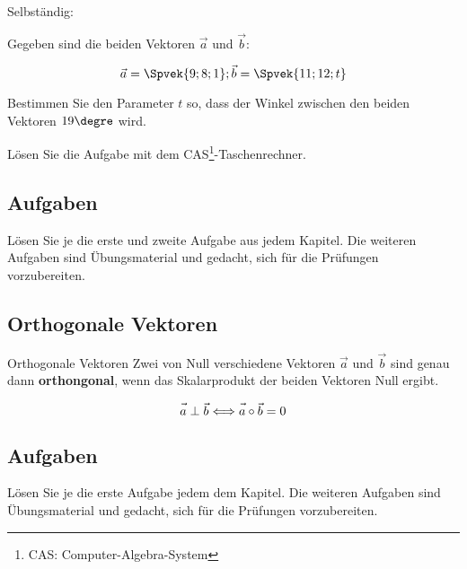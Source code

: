 
  Selbständig:

Gegeben sind die beiden Vektoren $\vec{a}$ und $\vec{b}$:

$$\vec{a} = \Spvek{9;8;1}; \vec{b} = \Spvek{11;12;t}$$

Bestimmen Sie den Parameter $t$ so, dass der Winkel zwischen den
beiden Vektoren $19\degre$ wird.

Lösen Sie die Aufgabe mit dem CAS\footnote{CAS: Computer-Algebra-System}-Taschenrechner.


  \newpage
  
  \subsection*{Aufgaben}

Lösen Sie je die erste und zweite Aufgabe aus jedem Kapitel. Die weiteren Aufgaben
sind Übungsmaterial und gedacht, sich für die Prüfungen vorzubereiten.




\newpage

\subsection{Orthogonale Vektoren}

\begin{gesetz}{Orthogonale Vektoren}{}
  Zwei von Null verschiedene Vektoren $\vec{a}$ und $\vec{b}$ sind genau dann
  \textbf{orthongonal}, wenn das Skalarprodukt der beiden Vektoren
  Null ergibt.


  $$\vec{\vphantom{b}a} \perp \vec{b} \Longleftrightarrow
  \vec{\vphantom{b}a}\circ{}\vec{b} = 0$$
\end{gesetz}

\subsection*{Aufgaben}

Lösen Sie je die erste Aufgabe jedem dem Kapitel. Die weiteren Aufgaben
sind Übungsmaterial und gedacht, sich für die Prüfungen vorzubereiten.

